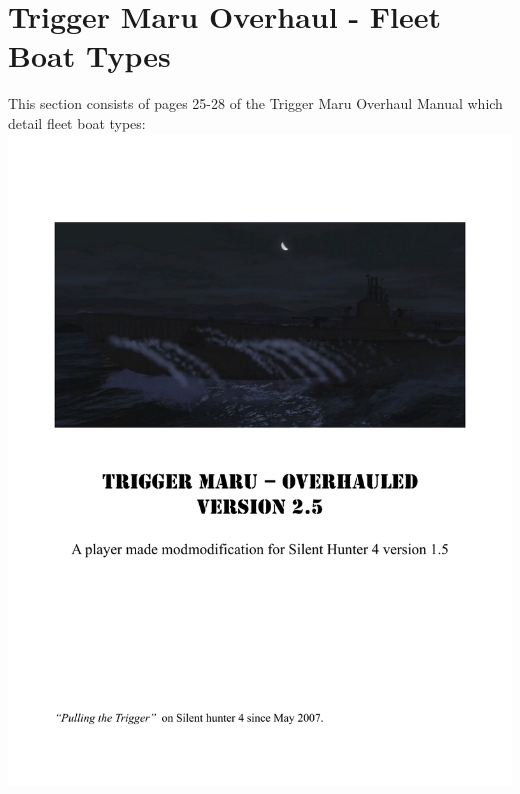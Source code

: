 \documentclass{article}
\begin{document}
\section{Trigger Maru Overhaul - Fleet Boat Types}
This section consists of pages 25-28 of the Trigger Maru Overhaul Manual which detail fleet boat types:
\includegraphics[page={25}, width=\textwidth, height=.95\textheight]{TMO_Manual}
\end{document}
